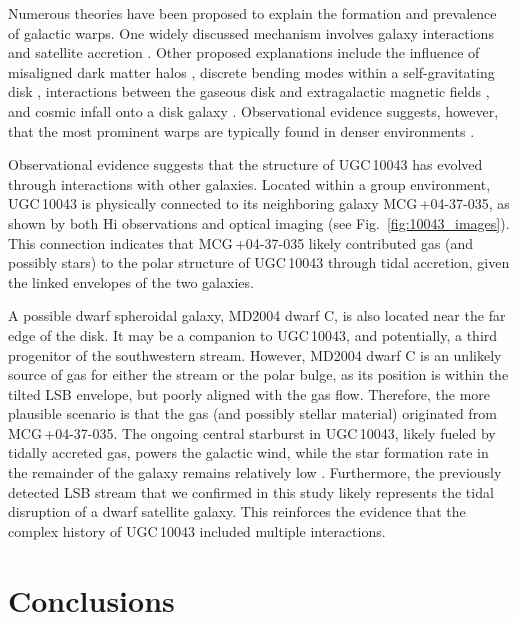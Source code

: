 \documentclass[letter]{aa}
\begin{document}
Numerous theories have been proposed to explain the formation and prevalence of galactic warps. One widely discussed mechanism involves galaxy interactions and satellite accretion \citep[e.g.,][]{1997ApJ...480..503H, 2014ApJ...789...90K, 2020MNRAS.498.3535S}. Other proposed explanations include the influence of misaligned dark matter halos \citep{1995ApJ...442..492D}, discrete bending modes within a self-gravitating disk \citep{1988MNRAS.234..873S}, interactions between the gaseous disk and extragalactic magnetic fields \citep{1990A&A...236....1B}, and cosmic infall onto a disk galaxy \citep{2006MNRAS.370....2S}. Observational evidence suggests, however, that the most prominent warps are typically found in denser environments \citep[e.g.,][]{1998A&A...337....9R, 1999A&AS..138..101R, 2001A&A...373..402S, 2006NewA...11..293A, 2016JKAS...49..239A}. 

Observational evidence suggests that the structure of UGC\,10043 has evolved through interactions with other galaxies. Located within a group environment, UGC\,10043 is physically connected to its neighboring galaxy MCG\,+04-37-035, as shown by both H{\sc i} observations \citep{aguirre09} and optical imaging (see Fig.~\ref{fig:10043_images}). This connection indicates that MCG\,+04-37-035 likely contributed gas (and possibly stars) to the polar structure of UGC\,10043 through tidal accretion, given the linked envelopes of the two galaxies.

A possible dwarf spheroidal galaxy, MD2004 dwarf C, is also located near the far edge of the disk. It may be a companion to UGC\,10043, and potentially, a third progenitor of the southwestern stream. However, MD2004 dwarf C is an unlikely source of gas for either the stream or the polar bulge, as its position is within the tilted LSB envelope, but poorly aligned with the gas flow. Therefore, the more plausible scenario is that the gas (and possibly stellar material) originated from MCG\,+04-37-035. The ongoing central starburst in UGC\,10043, likely fueled by tidally accreted gas, powers the galactic wind, while the star formation rate in the remainder of the galaxy remains relatively low \citep{2017MNRAS.467.4951L}. Furthermore, the previously detected LSB stream \citep{2011A&A...536A..66M} that we confirmed in this study likely represents the tidal disruption of a dwarf satellite galaxy. This reinforces the evidence that the complex history of UGC\,10043 included multiple interactions.


\section{Conclusions} \label{sec:conc}
\end{document}
